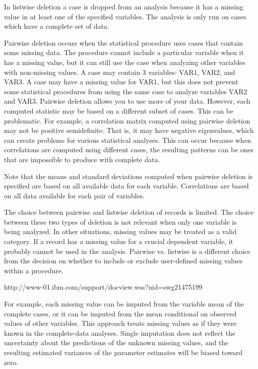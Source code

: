 \documentclass[11pt]{article} %
\begin{document}
In listwise deletion a case is dropped from an analysis because it has a missing value in at least one of the specified variables. The analysis is only run on cases which have a complete set of data.


Pairwise deletion occurs when the statistical procedure uses cases that 
contain some missing data. The procedure cannot include a particular variable 
when it has a missing value, but it can still use the case when analyzing other 
variables with non-missing values. 
A case may contain 3 variables: VAR1, VAR2, and VAR3. 
A case may have a missing value for VAR1, but this does not prevent some statistical 
procedures from using the same case to analyze variables VAR2 and VAR3. Pairwise deletion allows you to use more of your data. However, each computed statistic may be based
on a different subset of cases. This can be problematic. 
For example, a correlation matrix computed using pairwise deletion may not be 
positive semidefinite. That is, it may have negative eigenvalues, which can create problems for various statistical analyses. This can occur because when correlations are computed using different cases, the resulting patterns can be ones that are impossible to produce with complete data.

Note that the means and standard deviations computed when pairwise deletion 
is specified are based on all available data for each variable. 
Correlations are based on all data available for each pair of variables.

The choice between pairwise and listwise deletion of records is limited. The choice between these two types of deletion is not relevant when only one variable is being analyzed. In other situations, missing values may be treated as a valid category. If a record has a missing value for a crucial dependent variable, it probably cannot be used in the analysis. Pairwise vs. listwise is a different choice from the decision on whether to include or exclude user-defined missing values within a procedure. 


http://www-01.ibm.com/support/docview.wss?uid=swg21475199

For example, each missing value can
be imputed from the variable mean of the complete cases,
or it can be imputed from the mean conditional on observed
values of other variables. This approach treats missing values
as if they were known in the complete-data analyses.
Single imputation does not reflect the uncertainty about the
predictions of the unknown missing values, and the resulting
estimated variances of the parameter estimates will be
biased toward zero.
\end{document}
